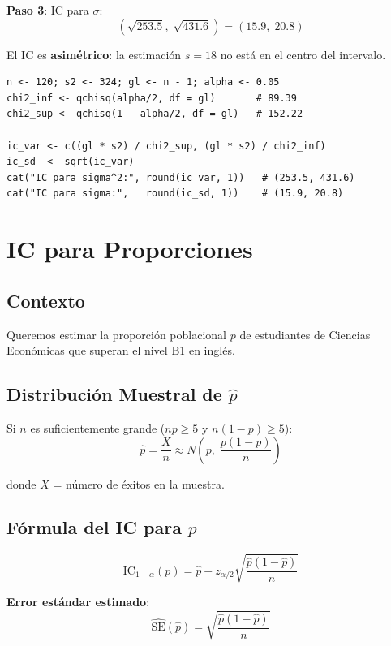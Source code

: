 \documentclass[11pt, a4paper]{article}
\begin{document}
\textbf{Paso 3}: IC para $\sigma$:
\[
\left(\sqrt{253.5}, \; \sqrt{431.6}\right) = (15.9, \; 20.8)
\]

El IC es \textbf{asim\'etrico}: la estimaci\'on $s = 18$ no est\'a en el centro del intervalo.

\begin{lstlisting}
n <- 120; s2 <- 324; gl <- n - 1; alpha <- 0.05
chi2_inf <- qchisq(alpha/2, df = gl)       # 89.39
chi2_sup <- qchisq(1 - alpha/2, df = gl)   # 152.22

ic_var <- c((gl * s2) / chi2_sup, (gl * s2) / chi2_inf)
ic_sd  <- sqrt(ic_var)
cat("IC para sigma^2:", round(ic_var, 1))   # (253.5, 431.6)
cat("IC para sigma:",   round(ic_sd, 1))    # (15.9, 20.8)
\end{lstlisting}

\section{IC para Proporciones}

\subsection{Contexto}

Queremos estimar la proporci\'on poblacional $p$ de estudiantes de Ciencias Econ\'omicas que superan el nivel B1 en ingl\'es.

\subsection{Distribuci\'on Muestral de $\hat{p}$}

Si $n$ es suficientemente grande ($np \geq 5$ y $n(1-p) \geq 5$):
\[
\hat{p} = \frac{X}{n} \approx N\!\left(p, \; \frac{p(1-p)}{n}\right)
\]

donde $X$ = n\'umero de \'exitos en la muestra.

\subsection{F\'ormula del IC para $p$}

\[
\boxed{\text{IC}_{1-\alpha}(p) = \hat{p} \pm z_{\alpha/2} \sqrt{\frac{\hat{p}(1-\hat{p})}{n}}}
\]

\textbf{Error est\'andar estimado}:
\[
\widehat{\text{SE}}(\hat{p}) = \sqrt{\frac{\hat{p}(1-\hat{p})}{n}}
\]
\end{document}

